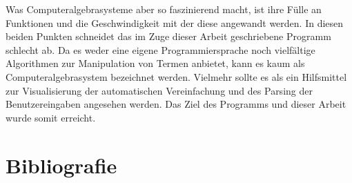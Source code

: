 \documentclass[11pt]{article}
\begin{document}
Was Computeralgebrasysteme aber so faszinierend macht, ist ihre Fülle an Funktionen und die Geschwindigkeit 
mit der diese angewandt werden. In diesen beiden Punkten schneidet das im Zuge dieser Arbeit
geschriebene Programm schlecht ab. Da es weder eine eigene Programmiersprache noch vielfältige Algorithmen
zur Manipulation von Termen anbietet, kann es kaum als Computeralgebrasystem bezeichnet werden.
Vielmehr sollte es als ein Hilfsmittel zur Visualisierung der automatischen Vereinfachung und des Parsing der 
Benutzereingaben angesehen werden. Das Ziel des Programms und dieser Arbeit wurde somit erreicht.

\section{Bibliografie}
\printbibliography[heading=none]
 
\end{document}
